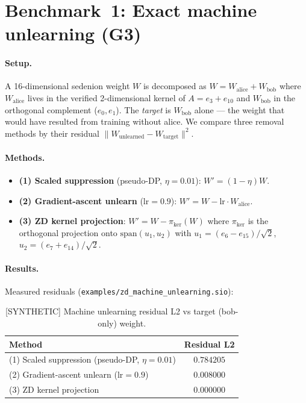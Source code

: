 \documentclass{article}
\begin{document}
\section{Benchmark~1: Exact machine unlearning (G3)}

\paragraph{Setup.}  A 16-dimensional sedenion weight $W$ is decomposed as
$W = W_\text{alice} + W_\text{bob}$ where $W_\text{alice}$ lives in the
verified 2-dimensional kernel of $A = e_3 + e_{10}$ and $W_\text{bob}$ in
the orthogonal complement ($e_0, e_1$).  The \emph{target} is
$W_\text{bob}$ alone --- the weight that would have resulted from training
without alice.  We compare three removal methods by their residual
$\lVert W_\text{unlearned} - W_\text{target} \rVert^2$.

\paragraph{Methods.}
\begin{itemize}
\item \textbf{(1) Scaled suppression} (pseudo-DP, $\eta = 0.01$):
      $W' = (1 - \eta) W$.
\item \textbf{(2) Gradient-ascent unlearn} ($\mathrm{lr} = 0.9$):
      $W' = W - \mathrm{lr} \cdot W_\text{alice}$.
\item \textbf{(3) ZD kernel projection}:
      $W' = W - \pi_{\ker}(W)$ where $\pi_{\ker}$ is the orthogonal
      projection onto $\mathrm{span}(u_1, u_2)$ with
      $u_1 = (e_6 - e_{15})/\sqrt{2}$, $u_2 = (e_7 + e_{14})/\sqrt{2}$.
\end{itemize}

\paragraph{Results.}  Measured residuals
(\texttt{examples/zd\_machine\_unlearning.sio}):

\begin{table}[h]
\centering
\caption{[SYNTHETIC] Machine unlearning residual L2 vs target (bob-only) weight.}
\label{tab:unlearning}
\begin{tabular}{@{}lc@{}}
\toprule
Method & Residual L2 \\
\midrule
(1) Scaled suppression (pseudo-DP, $\eta=0.01$) & $0.784205$ \\
(2) Gradient-ascent unlearn ($\mathrm{lr}=0.9$) & $0.008000$ \\
(3) ZD kernel projection                        & $\mathbf{0.000000}$ \\
\bottomrule
\end{tabular}
\end{table}
\end{document}
